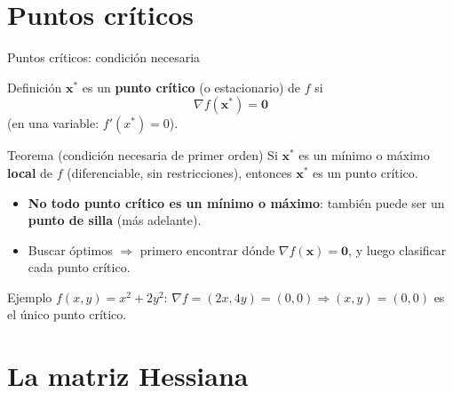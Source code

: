 \documentclass[aspectratio=169,10pt]{beamer}
\newcommand{\grad}{\nabla}
\newcommand{\x}{\mathbf{x}}
\begin{document}
\section{Puntos críticos}

\begin{frame}{Puntos críticos: condición necesaria}
  \small
  \begin{block}{Definición}
    $\x^*$ es un \textbf{punto crítico} (o estacionario) de $f$ si
    \[
      \grad f(\x^*) = \mathbf{0}
    \]
    (en una variable: $f'(x^*)=0$).
  \end{block}
  \begin{alertblock}{Teorema (condición necesaria de primer orden)}
    Si $\x^*$ es un mínimo o máximo \textbf{local} de $f$ (diferenciable, sin
    restricciones), entonces $\x^*$ es un punto crítico.
  \end{alertblock}
  \begin{itemize}
    \item \textbf{No todo punto crítico es un mínimo o máximo}: también
      puede ser un \textbf{punto de silla} (más adelante).
    \item Buscar óptimos $\Rightarrow$ primero encontrar dónde $\grad
      f(\x)=\mathbf{0}$, y luego clasificar cada punto crítico.
  \end{itemize}
  \begin{exampleblock}{Ejemplo}
    $f(x,y)=x^2+2y^2$: $\grad f = (2x,4y) = (0,0) \Rightarrow (x,y)=(0,0)$
    es el único punto crítico.
  \end{exampleblock}
\end{frame}

\section{La matriz Hessiana}
\end{document}
